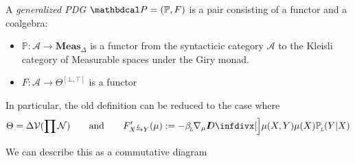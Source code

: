 \documentclass{article}
\begin{document}
	\begin{defn}
		A \emph{generalized PDG} $\dg P = (\mathbb P, F)$ is a pair consisting of a functor and a coalgebra:
		\begin{itemize}
			\item $\mathbb P : \mathcal A \to \mathbf{Meas}_{\Delta}$ is a functor from the syntacticic category $\mathcal A$ to the Kleisli category of Measurable spaces under the Giry monad.
			\item $F : \mathcal A \to \Theta^{[\bot,\top]}$ is a functor
		\end{itemize}
	\end{defn}

	In particular, the old definition can be reduced to the case where
	\[ 
		\Theta = \Delta\V(\prod \N)
			\qquad\text{and}\qquad 
		F'_{\ed LXY}(\mu) := - \beta\ssub L \nabla_\mu \kldiv[\Big]{\mu(X,Y)}{\mu(X) \mathbb P\ssub L(Y|X) }
	\]

	We can describe this as a commutative diagram
	\begin{center}
\end{center}

\end{document}
